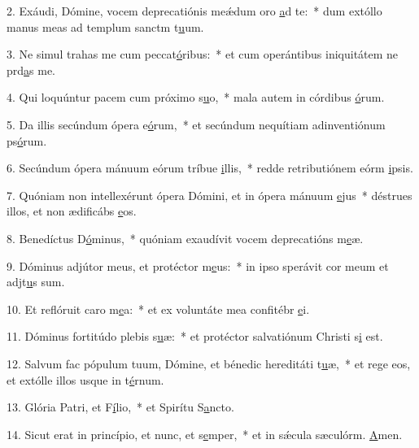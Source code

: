 2. Exáudi, Dómine, vocem deprecatiónis meǽdum oro \uline{a}d te:~* dum extóllo manus meas ad templum sanctm t\uline{u}um.\par 
3. Ne simul trahas me cum peccat\uline{ó}ribus:~* et cum operántibus iniquitátem ne prd\uline{a}s me.\par 
4. Qui loquúntur pacem cum próximo s\uline{u}o,~* mala autem in córdibus \uline{ó}rum.\par 
5. Da illis secúndum ópera e\uline{ó}rum,~* et secúndum nequítiam adinventiónum ps\uline{ó}rum.\par 
6. Secúndum ópera mánuum eórum tríbue \uline{i}llis,~* redde retributiónem eórm \uline{i}psis.\par 
7. Quóniam non intellexérunt ópera Dómini, et in ópera mánuum \uline{e}jus~* déstrues illos, et non ædificábs \uline{e}os.\par 
8. Benedíctus D\uline{ó}minus,~* quóniam exaudívit vocem deprecatións m\uline{e}æ.\par 
9. Dóminus adjútor meus, et protéctor m\uline{e}us:~* in ipso sperávit cor meum et adjt\uline{u}s sum.\par 
10. Et reflóruit caro m\uline{e}a:~* et ex voluntáte mea confitébr \uline{e}i.\par 
11. Dóminus fortitúdo plebis s\uline{u}æ:~* et protéctor salvatiónum Christi s\uline{i} est.\par 
12. Salvum fac pópulum tuum, Dómine, et bénedic hereditáti t\uline{u}æ,~* et rege eos, et extólle illos usque in t\uline{é}rnum.\par 
13. Glória Patri, et F\uline{í}lio,~* et Spirítu S\uline{a}ncto.\par 
14. Sicut erat in princípio, et nunc, et s\uline{e}mper,~* et in sǽcula sæculórm. \uline{A}men.\par 
